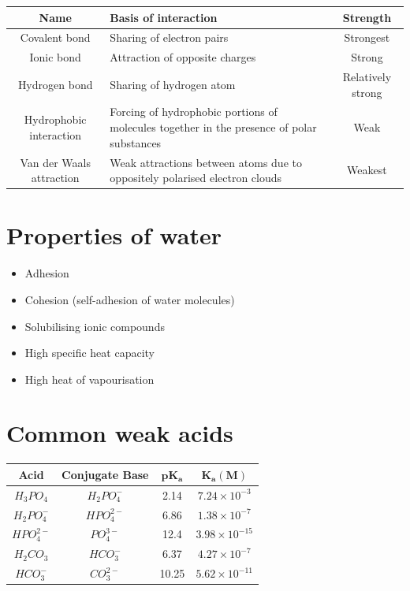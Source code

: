 \documentclass[11pt]{article}
\begin{document}
\begin{center}
\begin{tabular}{ |c|m{15em}|c| }
\hline
\textbf{Name} & \textbf{Basis of interaction} & \textbf{Strength} \\
\hline
Covalent bond & Sharing of electron pairs & Strongest \\
\hline
Ionic bond & Attraction of opposite charges & Strong \\
\hline
Hydrogen bond & Sharing of hydrogen atom & Relatively strong \\
\hline
Hydrophobic interaction & Forcing of hydrophobic portions of molecules together in the presence of polar substances & Weak \\
\hline
Van der Waals attraction & Weak attractions between atoms due to oppositely polarised electron clouds & Weakest \\
\hline
\end{tabular}
\end{center}

\newpage

\section{Properties of water}
\label{sec:orgbb0cbab}
\begin{itemize}
\item Adhesion
\item Cohesion (self-adhesion of water molecules)
\item Solubilising ionic compounds
\item High specific heat capacity
\item High heat of vapourisation
\end{itemize}

\section{Common weak acids}
\label{sec:org1d611a1}
\begin{center}
\begin{tabular}{ c c c c }
\textbf{Acid} & \textbf{Conjugate Base} & $\mathbf{pK_a}$ & $\mathbf{K_a (\si{M})}$ \\
\hline
$H_3PO_4$ & $H_2PO_4^-$ & 2.14 & $7.24 \times 10^{-3}$ \\
$H_2PO_4^-$ & $HPO_4^{2-}$ & 6.86 & $1.38 \times 10^{-7}$ \\
$HPO_4^{2-}$ & $PO_4^{3-}$ & 12.4 & $3.98 \times 10^{-15}$ \\
$H_2CO_3$ & $HCO_3^-$ & 6.37 & $4.27 \times 10^{-7}$ \\
$HCO_3^-$ & $CO_3^{2-}$ & 10.25 & $5.62 \times 10^{-11}$ \\
\end{tabular}
\end{center}
\end{document}
